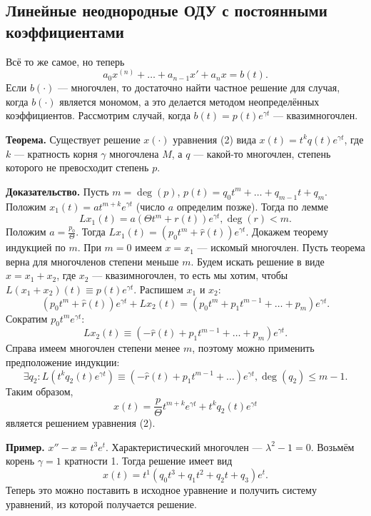 \QED

\subsection{Линейные неоднородные ОДУ с постоянными коэффициентами}
Всё то же самое, но теперь
\begin{equation}
    a_0 x^{(n)} + \dots + a_{n-1} x' + a_n x = b(t).
\end{equation}
Если $b(\cdot)$ --- многочлен, то достаточно найти частное решение для случая, когда $b(\cdot)$ является мономом, а это делается методом неопределённых коэффициентов.
Рассмотрим случай, когда $b(t) = p(t) e^{\gamma t}$ --- квазимногочлен.

\textbf{Теорема.} Существует решение $x(\cdot)$ уравнения (2) вида $x(t) = t^k q(t) e^{\gamma t}$, где $k$ --- кратность корня $\gamma$ многочлена $M$, а $q$ --- какой-то многочлен, степень которого не превосходит степень $p$.

\textbf{Доказательство.} Пусть $m = \deg(p)$, $p(t) = q_0 t^m + \dots + q_{m-1} t + q_m$.
Положим $x_1(t) = a t^{m+k} e^{\gamma t}$ (число $a$ определим позже).
Тогда по лемме
\[
    L x_1(t) = a(\Theta t^m + r(t)) e^{\gamma t}, \deg(r) < m.
\]
Положим $a = \frac{p_0}{\Theta}$. Тогда $Lx_1(t) = (p_0 t^m + \widehat r(t)) e^{\gamma t}$.
Докажем теорему индукцией по $m$. При $m = 0$ имеем $x = x_1$ --- искомый многочлен.
Пусть теорема верна для многочленов степени меньше $m$.
Будем искать решение в виде $x = x_1 + x_2$, где $x_2$ --- квазимногочлен, то есть мы хотим, чтобы $L(x_1 + x_2)(t) \equiv p(t) e^{\gamma t}$.
Распишем $x_1$ и $x_2$:
\[
    (p_0 t^m + \widehat r(t)) e^{\gamma t} + Lx_2(t) = (p_0 t^m + p_1 t^{m-1} + \dots + p_m) e^{\gamma t}.
\]
Сократим $p_0 t^m e^{\gamma t}$:
\[
    Lx_2(t) \equiv (-\widehat r(t) + p_1 t^{m-1} + \dots + p_m) e^{\gamma t}.
\]
Справа имеем многочлен степени менее $m$, поэтому можно применить предположение индукции:
\[
    \exists q_2: L(t^k q_2(t) e^{\gamma t}) \equiv (-\widehat r(t) + p_1 t^{m-1} + \dots) e^{\gamma t}, \deg(q_2) \le m - 1.
\]
Таким образом,
\[
    x(t) = \frac{p}{\Theta} t^{m+k} e^{\gamma t} + t^k q_2(t) e^{\gamma t}
\]
является решением уравнения (2).

\QED

\textbf{Пример.} $x'' - x = t^3 e^t$.
Характеристический многочлен --- $\lambda^2 - 1 = 0$. Возьмём корень $\gamma = 1$ кратности 1.
Тогда решение имеет вид
\[
    x(t) = t^1 (q_0t^3 + q_1t^2 + q_2 t + q_3) e^t.
\]
Теперь это можно поставить в исходное уравнение и получить систему уравнений, из которой получается решение.

